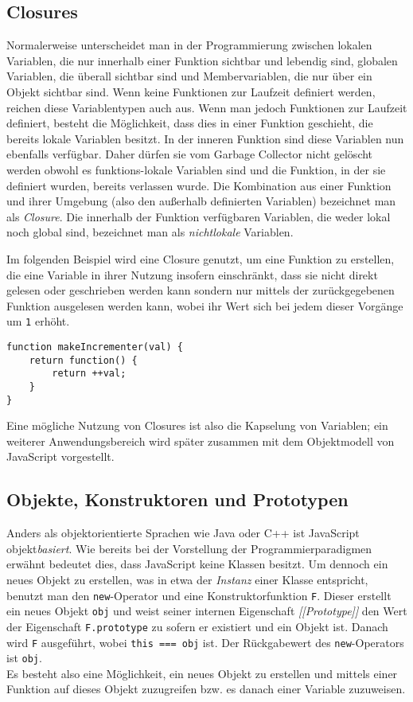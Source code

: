 \subsection{Closures}
Normalerweise unterscheidet man in der Programmierung zwischen lokalen Variablen, die nur innerhalb
einer Funktion sichtbar und lebendig sind, globalen Variablen, die überall sichtbar sind und Membervariablen, die
nur über ein Objekt sichtbar sind. Wenn keine Funktionen zur Laufzeit definiert werden, reichen
diese Variablentypen auch aus. Wenn man jedoch Funktionen zur Laufzeit definiert, besteht die
Möglichkeit, dass dies in einer Funktion geschieht, die bereits lokale Variablen besitzt. In der
inneren Funktion sind diese Variablen nun ebenfalls verfügbar. Daher dürfen sie vom Garbage
Collector nicht gelöscht werden obwohl es funktions-lokale Variablen sind und die Funktion, in der
sie definiert wurden, bereits verlassen wurde. Die Kombination aus einer Funktion und ihrer Umgebung
(also den außerhalb definierten Variablen) bezeichnet man als \emph{Closure}. Die innerhalb der
Funktion verfügbaren Variablen, die weder lokal noch global sind, bezeichnet man als
\emph{nichtlokale} Variablen.

Im folgenden Beispiel wird eine Closure genutzt, um eine Funktion zu erstellen, die eine Variable in
ihrer Nutzung insofern einschränkt, dass sie nicht direkt gelesen oder geschrieben werden kann
sondern nur mittels der zurückgegebenen Funktion ausgelesen werden kann, wobei ihr Wert sich bei
jedem dieser Vorgänge um \lstinline{1} erhöht.

\begin{lstlisting}[caption=Beispiel für eine Closure]
function makeIncrementer(val) {
    return function() {
        return ++val;
    }
}
\end{lstlisting}

Eine mögliche Nutzung von Closures ist also die Kapselung von Variablen; ein weiterer
Anwendungsbereich wird später zusammen mit dem Objektmodell von JavaScript vorgestellt.


\subsection{Objekte, Konstruktoren und Prototypen}
Anders als objektorientierte Sprachen wie Java oder C++ ist JavaScript objekt\emph{basiert}. Wie
bereits bei der Vorstellung der Programmierparadigmen erwähnt bedeutet dies, dass JavaScript keine
Klassen besitzt. Um dennoch ein neues Objekt zu erstellen, was in etwa der \emph{Instanz} einer
Klasse entspricht, benutzt man den \lstinline{new}-Operator und eine Konstruktorfunktion
\lstinline{F}. Dieser erstellt ein neues Objekt \lstinline{obj} und weist seiner internen
Eigenschaft \emph{[[Prototype]]} den Wert der Eigenschaft \lstinline{F.prototype} zu sofern er
existiert und ein Objekt ist. Danach wird \lstinline{F} ausgeführt, wobei \lstinline{this === obj}
ist. Der Rückgabewert des \lstinline{new}-Operators ist \lstinline{obj}. \\
Es besteht also eine Möglichkeit, ein neues Objekt zu erstellen und mittels einer Funktion auf
dieses Objekt zuzugreifen bzw. es danach einer Variable zuzuweisen.

